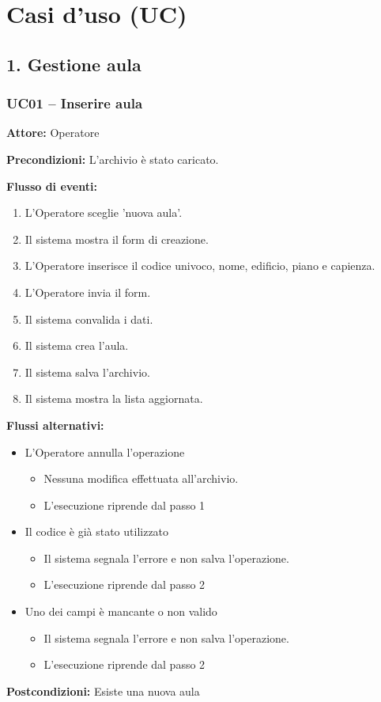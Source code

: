 \documentclass[a4paper,11pt]{article}
\begin{document}
\newpage
\section*{Casi d'uso (UC)}
\subsection*{1. Gestione aula}
\begin{samepage}
\subsubsection*{UC01 -- Inserire aula}
\begin{ucbox}

\noindent\textbf{Attore:} Operatore\par
\noindent\textbf{Precondizioni:} L'archivio è stato caricato.\par

\noindent\textbf{Flusso di eventi:}
\begin{enumerate}
\item L'Operatore sceglie 'nuova aula'. \item Il sistema mostra il form di creazione. \item L'Operatore inserisce il codice univoco, nome, edificio, piano e capienza. \item L'Operatore invia il form. \item Il sistema convalida i dati. \item Il sistema crea l'aula. \item Il sistema salva l'archivio. \item Il sistema mostra la lista aggiornata. \end{enumerate}
\noindent\textbf{Flussi alternativi:}
\begin{itemize}
\item[4a.] L'Operatore annulla l'operazione
\begin{itemize}
\item Nessuna modifica effettuata all'archivio.
\item L'esecuzione riprende dal passo 1
\end{itemize}
\item[5a.] Il codice è già stato utilizzato
\begin{itemize}
\item Il sistema segnala l'errore e non salva l'operazione.
\item L'esecuzione riprende dal passo 2
\end{itemize}
\item[5b.] Uno dei campi è mancante o non valido
\begin{itemize}
\item Il sistema segnala l'errore e non salva l'operazione.
\item L'esecuzione riprende dal passo 2
\end{itemize}
\end{itemize}
\noindent\textbf{Postcondizioni:} Esiste una nuova aula\par
\end{ucbox}
\end{samepage}
\end{document}
